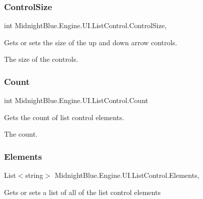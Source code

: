 \subsubsection{\texorpdfstring{Control\+Size}{ControlSize}}
{\footnotesize\ttfamily int Midnight\+Blue.\+Engine.\+U\+I.\+List\+Control.\+Control\+Size\hspace{0.3cm}{\ttfamily [get]}, {\ttfamily [set]}}



Gets or sets the size of the up and down arrow controls. 

The size of the controls.\hypertarget{class_midnight_blue_1_1_engine_1_1_u_i_1_1_list_control_aac9ef8692391a220f8462df06720f42a}{}\label{class_midnight_blue_1_1_engine_1_1_u_i_1_1_list_control_aac9ef8692391a220f8462df06720f42a} 
\subsubsection{\texorpdfstring{Count}{Count}}
{\footnotesize\ttfamily int Midnight\+Blue.\+Engine.\+U\+I.\+List\+Control.\+Count\hspace{0.3cm}{\ttfamily [get]}}



Gets the count of list control elements. 

The count.\hypertarget{class_midnight_blue_1_1_engine_1_1_u_i_1_1_list_control_a564e4c395ac839e5110c5c08575d690f}{}\label{class_midnight_blue_1_1_engine_1_1_u_i_1_1_list_control_a564e4c395ac839e5110c5c08575d690f} 
\subsubsection{\texorpdfstring{Elements}{Elements}}
{\footnotesize\ttfamily List$<$string$>$ Midnight\+Blue.\+Engine.\+U\+I.\+List\+Control.\+Elements\hspace{0.3cm}{\ttfamily [get]}, {\ttfamily [set]}}



Gets or sets a list of all of the list control elements 

